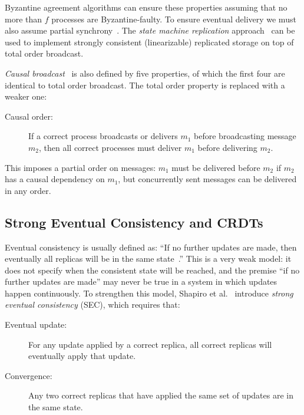 \documentclass[a4paper,anonymous,USenglish]{lipics-v2019}
\begin{document}
Byzantine agreement algorithms can ensure these properties assuming that no more than $f$ processes are Byzantine-faulty.
To ensure eventual delivery we must also assume partial synchrony~\cite{Dwork:1988}.
The \emph{state machine replication} approach~\cite{Schneider:1990} can be used to implement strongly consistent (linearizable) replicated storage on top of total order broadcast.

\emph{Causal broadcast}~\cite{Birman:1991el,Cachin:2011wt} is also defined by five properties, of which the first four are identical to total order broadcast.
The total order property is replaced with a weaker one:

\begin{description}
\item[Causal order:] If a correct process broadcasts or delivers $m_1$ before broadcasting message $m_2$, then all correct processes must deliver $m_1$ before delivering $m_2$.
\end{description}

This imposes a partial order on messages: $m_1$ must be delivered before $m_2$ if $m_2$ has a causal dependency on $m_1$, but concurrently sent messages can be delivered in any order.

\subsection{Strong Eventual Consistency and CRDTs}\label{sec:applications}

Eventual consistency is usually defined as: ``If no further updates are made, then eventually all replicas will be in the same state~\cite{Vogels:2009ca}.''
This is a very weak model: it does not specify when the consistent state will be reached, and the premise ``if no further updates are made'' may never be true in a system in which updates happen continuously.
To strengthen this model, Shapiro et al.~\cite{Shapiro:2011} introduce \emph{strong eventual consistency} (SEC), which requires that:

\begin{description}
\item[Eventual update:] For any update applied by a correct replica, all correct replicas will eventually apply that update.
\item[Convergence:] Any two correct replicas that have applied the same set of updates are in the same state.
\end{description}
\end{document}
